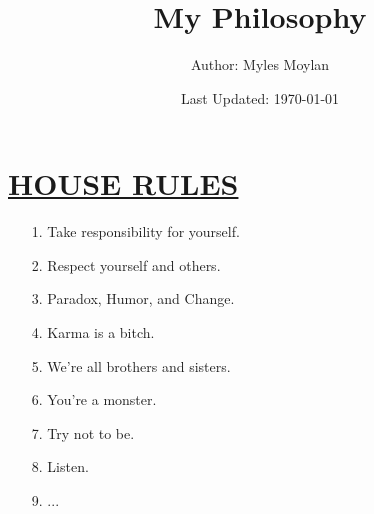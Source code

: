\documentclass[11pt]{article}
\title{	
	\normalfont \normalsize 
	\huge My Philosophy
}
\author{Author: Myles Moylan}
\date{Last Updated: \normalsize\today}
\begin{document}
\maketitle
\section*{\ul{HOUSE RULES}}
\begin{enumerate}
	\item[1.] Take responsibility for yourself.
	\item[2.] Respect yourself and others.
	\item[3.] Paradox, Humor, and Change.
	\item[4.] Karma is a bitch.
	\item[5.] We're all brothers and sisters.
	\item[6.] You're a monster.
	\item[7.] Try not to be.
	\item[8.] Listen.
	\item[9.] ...
\end{enumerate}
\end{document}
